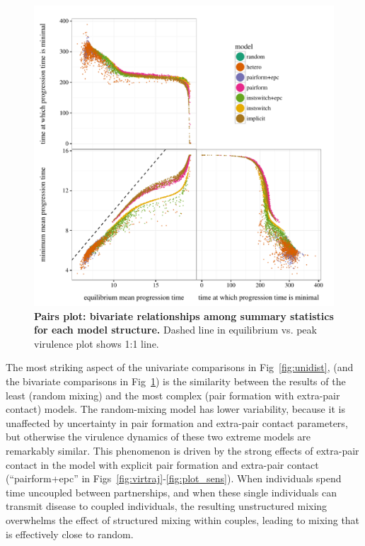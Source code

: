 \documentclass[10pt,letterpaper]{article}
\renewcommand{\figurename}{Fig}
\begin{document}
\begin{figure}[!ht]
\includegraphics[width=\textwidth]{../figures/fig4.pdf}
\caption{{\bf Pairs plot: bivariate relationships among summary statistics for each model structure.}
Dashed line in equilibrium vs. peak virulence plot shows 1:1 line.}
\label{fig:pairplot}
\end{figure}

The most striking aspect of the univariate comparisons in
\figurename~\ref{fig:unidist}, (and the bivariate comparisons in
\figurename~\ref{fig:pairplot}) is the similarity between the results of the
least (random mixing) and the most complex (pair formation with
extra-pair contact) models. The random-mixing model has lower
variability, because it is unaffected by uncertainty in pair formation
and extra-pair contact parameters, but otherwise the virulence
dynamics of these two extreme models are remarkably similar.
This phenomenon is driven by the strong effects of extra-pair contact in the
model with explicit pair formation and extra-pair contact 
(``pairform+epc'' in \figurename{}s~\ref{fig:virtraj}-\ref{fig:plot_sens}). When individuals spend time uncoupled between
partnerships, and when these single individuals can transmit disease
to coupled individuals, the resulting unstructured mixing overwhelms
the effect of structured mixing within couples, leading to mixing
that is effectively close to random.
\end{document}
